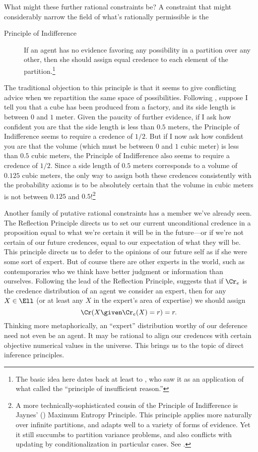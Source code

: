 What might these further rational constraints be? A constraint that might considerably narrow the field of what's rationally permissible is the 
\begin{description}
\item[Principle of Indifference]{If an agent has no evidence favoring any possibility in a partition over any other, then she should assign equal credence to each element of the partition.\footnote
{The basic idea here dates back at least to \citet{LaplaceEssay}, who saw it as an application of what \citet{BernoulliArs} called the ``principle of insufficient reason.''}}
\end{description}
The traditional objection to this principle is that it seems to give conflicting advice when we repartition the same space of possibilities. Following \citet{vanFraassenSymmetry}, suppose I tell you that a cube has been produced from a factory, and its side length is between $0$ and $1$ meter. Given the paucity of further evidence, if I ask how confident you are that the side length is less than $0.5$ meters, the Principle of Indifference seems to require a credence of $1/2$. But if I now ask how confident you are that the volume (which must be between $0$ and $1$ cubic meter) is less than $0.5$ cubic meters, the Principle of Indifference also seems to require a credence of $1/2$. Since a side length of $0.5$ meters corresponds to a volume of $0.125$ cubic meters, the only way to assign both these credences consistently with the probability axioms is to be absolutely certain that the volume in cubic meters is not between $0.125$ and $0.5$!\footnote
{A more technically-sophisticated cousin of the Principle of Indifference is Jaynes' (\citeyear{JaynesI,JaynesII}) Maximum Entropy Principle. This principle applies more naturally over infinite partitions, and adapts well to a variety of forms of evidence. Yet it still succumbs to partition variance problems, and also conflicts with updating by conditionalization in particular cases. See \citet{SeidenfeldEntropy}.}

Another family of putative rational constraints has a member we've already seen. The Reflection Principle directs us to set our current unconditional credence in a proposition equal to what we're certain it will be in the future---or if we're not certain of our future credences, equal to our expectation of what they will be. This principle directs us to defer to the opinions of our future self as if she were some sort of expert. But of course there are other experts in the world, such as contemporaries who we think have better judgment or information than ourselves. Following the lead of the Reflection Principle, \citet{ElgaReflection} suggests that if $\Cr_e$ is the credence distribution of an agent we consider an expert, then for any $X \in \Ell$ (or at least any $X$ in the expert's area of expertise) we should assign
\begin{equation}
\Cr(X \given \Cr_e(X)=r)=r. 
\end{equation}
Thinking more metaphorically, an ``expert'' distribution worthy of our deference need not even be an agent. It may be rational to align our credences with certain objective numerical values in the universe. This brings us to the topic of direct inference principles.


